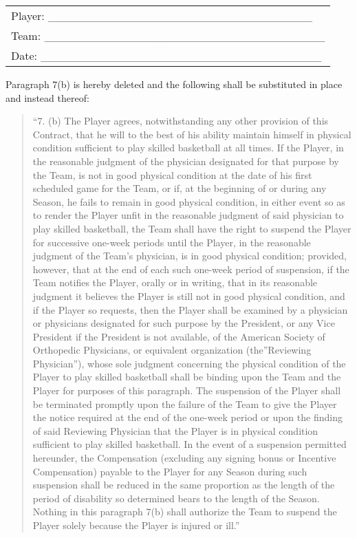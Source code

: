 \documentclass[
]{book}
\begin{document}
\begin{longtable}[]{@{}l@{}}
\toprule()
\endhead
Player: \_\_\_\_\_\_\_\_\_\_\_\_\_\_\_\_\_\_\_\_\_\_\_\_\_\_\_\_\_\_\_\_ \\
Team: \_\_\_\_\_\_\_\_\_\_\_\_\_\_\_\_\_\_\_\_\_\_\_\_\_\_\_\_\_\_\_\_\_\_ \\
Date: \_\_\_\_\_\_\_\_\_\_\_\_\_\_\_\_\_\_\_\_\_\_\_\_\_\_\_\_\_\_\_\_\_\_ \\
\bottomrule()
\end{longtable}

Paragraph 7(b) is hereby deleted and the following shall be substituted in place and instead thereof:

\begin{quote}
``7. (b) The Player agrees, notwithstanding any other provision of this Contract, that he will to the best of his ability maintain himself in physical condition sufficient to play skilled basketball at all times. If the Player, in the reasonable judgment of the physician designated for that purpose by the Team, is not in good physical condition at the date of his first scheduled game for the Team, or if, at the beginning of or during any Season, he fails to remain in good physical condition, in either event so as to render the Player unfit in the reasonable judgment of said physician to play skilled basketball, the Team shall have the right to suspend the Player for successive one-week periods until the Player, in the reasonable judgment of the Team's physician, is in good physical condition; provided, however, that at the end of each such one-week period of suspension, if the Team notifies the Player, orally or in writing, that in its reasonable judgment it believes the Player is still not in good physical condition, and if the Player so requests, then the Player shall be examined by a physician or physicians designated for such purpose by the President, or any Vice President if the President is not available, of the American Society of Orthopedic Physicians, or equivalent organization (the''Reviewing Physician''), whose sole judgment concerning the physical condition of the Player to play skilled basketball shall be binding upon the Team and the Player for purposes of this paragraph. The suspension of the Player shall be terminated promptly upon the failure of the Team to give the Player the notice required at the end of the one-week period or upon the finding of said Reviewing Physician that the Player is in physical condition sufficient to play skilled basketball. In the event of a suspension permitted hereunder, the Compensation (excluding any signing bonus or Incentive Compensation) payable to the Player for any Season during such suspension shall be reduced in the same proportion as the length of the period of disability so determined bears to the length of the Season. Nothing in this paragraph 7(b) shall authorize the Team to suspend the Player solely because the Player is injured or ill.''
\end{quote}
\end{document}
